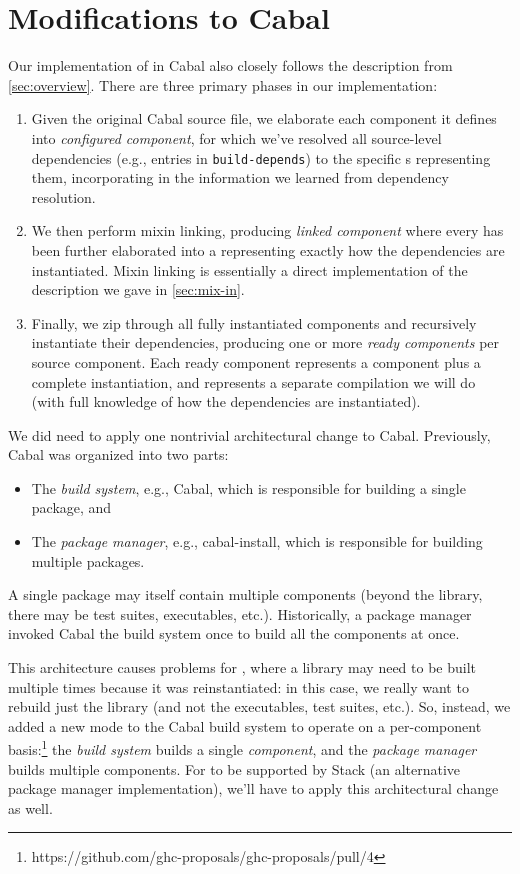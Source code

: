 \section{Modifications to Cabal}

Our implementation of \Backpack{} in Cabal also closely follows the description
from \cref{sec:overview}.  There are three primary phases in our
implementation:

\begin{enumerate}
    \item Given the original Cabal source file, we elaborate each
    component it defines into \emph{configured component},
    for which we've resolved all source-level dependencies
    (e.g., entries in \verb|build-depends|) to the specific
    \cid{}s representing them, incorporating in the information
    we learned from dependency resolution.

    \item We then perform mixin linking, producing \emph{linked component}
    where every \cid{} has been further elaborated into a \uid{}
    representing exactly how the dependencies are instantiated.
    Mixin linking is essentially a direct implementation of the
    description we gave in \cref{sec:mix-in}.

    \item Finally, we zip through all fully instantiated components
    and recursively instantiate their dependencies, producing one or
    more \emph{ready components} per source component.  Each ready
    component represents a component plus a complete instantiation,
    and represents a separate compilation we will do (with full
    knowledge of how the dependencies are instantiated).
\end{enumerate}
%
We did need to apply one nontrivial architectural change to Cabal.
Previously, Cabal was organized into two parts:

\begin{itemize}
    \item The \emph{build system}, e.g., Cabal, which is responsible for
    building a single package, and

    \item The \emph{package manager}, e.g., cabal-install, which is
    responsible for building multiple packages.
\end{itemize}
%
A single package may itself contain multiple components (beyond the library,
there may be test suites, executables, etc.). Historically, a package manager
invoked Cabal the build system once to build all the components at once.

This architecture causes problems for \Backpack, where a library may need
to be built multiple times because it was reinstantiated: in this case, we really want to
rebuild just the library (and not the executables, test suites, etc.).
So, instead, we added a new mode to the Cabal build system to operate
on a per-component basis:\footnote{https://github.com/ghc-proposals/ghc-proposals/pull/4}
the \emph{build system} builds a single \emph{component}, and
the \emph{package manager} builds multiple components.  For \Backpack{} to be
supported by Stack (an alternative package manager implementation), we'll have
to apply this architectural change as well.
